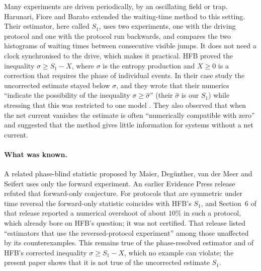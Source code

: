 \documentclass[11pt,a4paper]{article}
\begin{document}
Many experiments are driven periodically, by an oscillating field or trap. Harunari, Fiore and Barato \cite{hfb} extended the waiting-time method to this setting. Their estimator, here called $S_1$, uses two experiments, one with the driving protocol and one with the protocol run backwards, and compares the two histograms of waiting times between consecutive visible jumps. It does not need a clock synchronised to the drive, which makes it practical. HFB proved the inequality $\sigma\geq S_1-X$, where $\sigma$ is the entropy production and $X\ge0$ is a correction that requires the phase of individual events. In their case study the uncorrected estimate stayed below $\sigma$, and they wrote that their numerics ``indicate the possibility of the inequality $\sigma\ge\hat\sigma$'' (their $\hat\sigma$ is our $S_1$) while stressing that this was restricted to one model \cite[Sec.~VI]{hfb}. They also observed that when the net current vanishes the estimate is often ``numerically compatible with zero'' and suggested that the method gives little information for systems without a net current.

\paragraph{What was known.} A related phase-blind statistic proposed by Maier, Deg\"unther, van der Meer and Seifert \cite{maier} uses only the forward experiment. An earlier Evidence Press release \cite{ep} refuted that forward-only conjecture. For protocols that are symmetric under time reversal the forward-only statistic coincides with HFB's $S_1$, and Section~6 of that release reported a numerical overshoot of about $10\%$ in such a protocol, which already bore on HFB's question; it was not certified. That release listed ``estimators that use the reversed-protocol experiment'' among those unaffected by its counterexamples. This remains true of the phase-resolved estimator and of HFB's corrected inequality $\sigma\ge S_1-X$, which no example can violate; the present paper shows that it is not true of the uncorrected estimate $S_1$.
\end{document}
